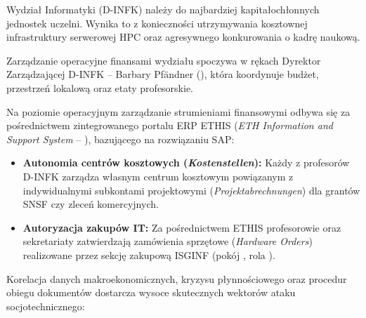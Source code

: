 
Wydział Informatyki (D-INFK) należy do najbardziej kapitałochłonnych jednostek uczelni. Wynika to z konieczności utrzymywania kosztownej infrastruktury serwerowej HPC oraz agresywnego konkurowania o kadrę naukową.

Zarządzanie operacyjne finansami wydziału spoczywa w rękach Dyrektor Zarządzającej D-INFK -- Barbary Pf{\"a}ndner (), która koordynuje budżet, przestrzeń lokalową oraz etaty profesorskie.

Na poziomie operacyjnym zarządzanie strumieniami finansowymi odbywa się za pośrednictwem zintegrowanego portalu ERP ETHIS (\textit{ETH Information and Support System} -- ), bazującego na rozwiązaniu SAP:
\begin{itemize}
    \item \textbf{Autonomia centrów kosztowych (\textit{Kostenstellen}):} Każdy z profesorów D-INFK zarządza własnym centrum kosztowym powiązanym z indywidualnymi subkontami projektowymi (\textit{Projektabrechnungen}) dla grantów SNSF czy zleceń komercyjnych.
    \item \textbf{Autoryzacja zakupów IT:} Za pośrednictwem ETHIS profesorowie oraz sekretariaty zatwierdzają zamówienia sprzętowe (\textit{Hardware Orders}) realizowane przez sekcję zakupową ISGINF (pokój , rola ).
\end{itemize}


Korelacja danych makroekonomicznych, kryzysu płynnościowego oraz procedur obiegu dokumentów dostarcza wysoce skutecznych wektorów ataku socjotechnicznego:

